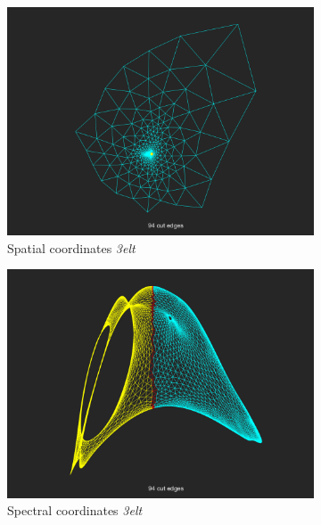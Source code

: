 \documentclass[unicode,11pt,a4paper,oneside,numbers=endperiod,openany]{scrartcl}
\begin{document}
\begin{enumerate}
	\begin{figure}[h!]
		\centering
		\begin{subfigure}[b]{0.45\textwidth}
		\includegraphics[width=\textwidth]{images/3elt_normal.png}
		\caption{Spatial coordinates \textit{3elt}}
		\end{subfigure}
		\hfill
		\begin{subfigure}[b]{0.45\textwidth}
		\includegraphics[width=\textwidth]{images/3elt_strange.png}
		\caption{Spectral coordinates \textit{3elt}}
		\end{subfigure}
		\vfill
		\begin{subfigure}[b]{0.45\textwidth}

\end{subfigure}
\end{figure}
\end{enumerate}
\end{document}
